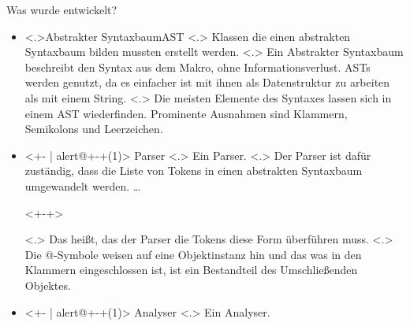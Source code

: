 \begin{frame}{Was wurde entwickelt?}
\begin{itemize}[<+- | alert@+>]
      \item
        \temporal<.>{}{Abstrakter Syntaxbaum}{AST}
            \note[item]<.>{
              Klassen die einen abstrakten Syntaxbaum bilden mussten erstellt werden.
            }
            \note[item]<.>{
              Ein Abstrakter Syntaxbaum beschreibt den Syntax aus dem Makro, ohne  Informationsverlust. ASTs werden genutzt, da es einfacher ist mit ihnen als Datenstruktur zu arbeiten als mit einem String.
            }
            \note[item]<.>{
              Die meisten Elemente des Syntaxes lassen sich in einem AST wiederfinden. Prominente Ausnahmen sind Klammern, Semikolons und Leerzeichen.
            }
      \item<+- | alert@+-+(1)>
        Parser%
            \note[item]<.>{
              Ein Parser.
            }
            \note[item]<.>{
              Der Parser ist dafür zuständig, dass die Liste von Tokens in einen abstrakten Syntaxbaum umgewandelt werden.
              \ldots
            }%
        \begin{uncoverenv}<+-+>%
        \end{uncoverenv}%
            \note[item]<.>{
              Das heißt, das der Parser die Tokens diese Form überführen muss.
            }%
            \note[item]<.>{
              Die @-Symbole weisen auf eine Objektinstanz hin und das was in den Klammern eingeschlossen ist, ist ein Bestandteil des Umschließenden Objektes.
            }%
      \item<+- | alert@+-+(1)>
        Analyser%
            \note[item]<.>{
              Ein Analyser.
}
\end{itemize}
\end{frame}
